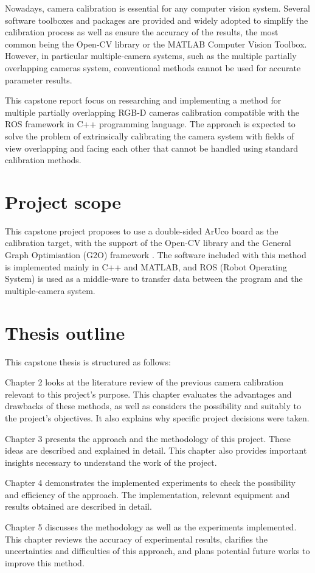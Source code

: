 Nowadays, camera calibration is essential for any computer vision system. Several software toolboxes and packages are provided and widely adopted to simplify the calibration process as well as ensure the accuracy of the results, the most common being the Open-CV library or the MATLAB Computer Vision Toolbox. However, in particular multiple-camera systems, such as the multiple partially overlapping cameras system, conventional methods cannot be used for accurate parameter results.

This capstone report focus on researching and implementing a method for multiple partially overlapping RGB-D cameras calibration compatible with the ROS framework in C++ programming language. The approach is expected to solve the problem of extrinsically calibrating the camera system with fields of view overlapping and facing each other that cannot be handled using standard calibration methods.

\section{Project scope}
This capstone project proposes to use a double-sided ArUco board as the calibration target, with the support of the Open-CV library and the General Graph Optimisation (G2O) framework \citep{Kummerle2011}. The software included with this method is implemented mainly in C++ and MATLAB, and ROS (Robot Operating System) is used as a middle-ware to transfer data between the program and the multiple-camera system.

\section{Thesis outline}
This capstone thesis is structured as follows:

Chapter 2 looks at the literature review of the previous camera calibration relevant to this project's purpose. This chapter evaluates the advantages and drawbacks of these methods, as well as considers the possibility and suitably to the project's objectives. It also explains why specific project decisions were taken.

Chapter 3 presents the approach and the methodology of this project. These ideas are described and explained in detail. This chapter also provides important insights necessary to understand the work of the project.

Chapter 4 demonstrates the implemented experiments to check the possibility and efficiency of the approach. The implementation, relevant equipment and results obtained are described in detail. 

Chapter 5 discusses the methodology as well as the experiments implemented. This chapter reviews the accuracy of experimental results, clarifies the uncertainties and difficulties of this approach, and plans potential future works to improve this method.